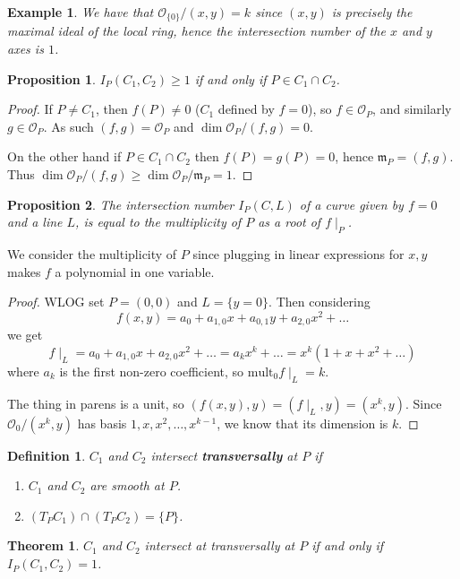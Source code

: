 \documentclass[12pt]{article}
\newcommand{\m}{\mathfrak{m}}
\renewcommand{\O}{\mathcal{O}}
\newcommand{\mult}{\mathrm{mult}}
\newtheorem{definition}{Definition}[section]
\newtheorem*{example}{Example}
\newtheorem{theorem}{Theorem}[section]
\newtheorem{proposition}{Proposition}[section]
\begin{document}
    \begin{example}
        We have that $\O_{\{0\}}/(x, y) = k$ since $(x, y)$ is precisely the maximal ideal of the local ring, hence the interesection number of the $x$ and $y$ axes is $1$.
    \end{example}
    \begin{proposition}
        $I_P(C_1, C_2) \geq 1$ if and only if $P \in C_1 \cap C_2$.
    \end{proposition}
    \begin{proof}
        If $P\neq C_1$, then $f(P) \neq 0$ ($C_1$ defined by $f= 0$), so $f \in \O_P$, and similarly $g \in \O_P$. As such $(f, g) = \O_P$ and $\dim \O_P/(f, g) = 0$. \par
        On the other hand if $P \in C_1 \cap C_2$ then $f(P) = g(P) = 0$, hence $\m_P = (f, g)$. Thus $\dim \O_P/(f, g) \geq \dim \O_P/\m_P = 1$.
    \end{proof}
    \begin{proposition}
        The intersection number $I_P(C, L)$ of a curve given by $f = 0$ and a line $L$, is equal to the multiplicity of $P$ as a root of $f\mid_P$.
    \end{proposition}
    We consider the multiplicity of $P$ since plugging in linear expressions for $x, y$ makes $f$ a polynomial in one variable. \par
    \begin{proof}
        WLOG set $P = (0, 0)$ and $L = \{y = 0\}$. Then considering
        $$f(x, y) = a_0 + a_{1, 0}x + a_{0,1}y + a_{2, 0}x^2 + \dots $$
        we get
        $$f\mid_L = a_0 + a_{1, 0}x + a_{2, 0}x^2 + \dots = a_kx^k + \dots = x^k(1 + x + x^2 + \dots)$$
        where $a_k$ is the first non-zero coefficient, so $\mult_0 f\mid_L = k$. \par
        The thing in parens is a unit, so $(f(x, y), y) = (f\mid_L, y) = (x^k, y)$. Since $\O_0/(x^k, y)$ has basis $1, x, x^2, \dots, x^{k-1}$, we know that its dimension is $k$.
    \end{proof}
    \begin{definition}
        $C_1$ and $C_2$ intersect \textbf{transversally} at $P$ if
        \begin{enumerate}
            \item $C_1$ and $C_2$ are smooth at $P$.
            \item $(T_PC_1) \cap (T_PC_2) = \{P\}$.
        \end{enumerate}
    \end{definition}
    \begin{theorem}\label{thm:1_int}
        $C_1$ and $C_2$ intersect at transversally at $P$ if and only if $I_P(C_1, C_2) = 1$.
    \end{theorem}
\end{document}
